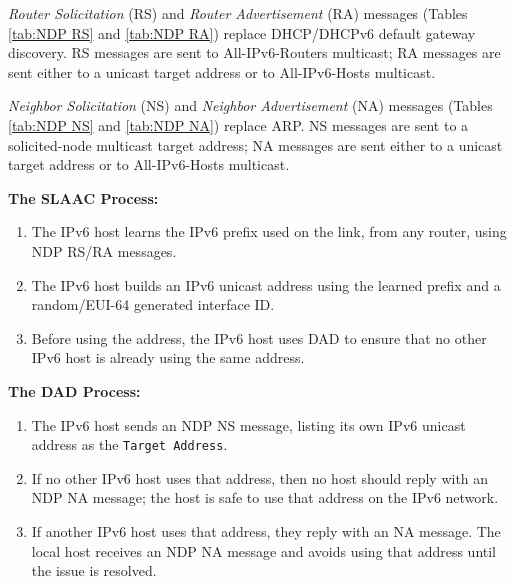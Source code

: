 \documentclass[12pt]{article}
\begin{document}
	\textit{Router Solicitation} (RS) and \textit{Router Advertisement} (RA) messages (Tables \ref{tab:NDP RS} and \ref{tab:NDP RA}) replace DHCP/DHCPv6 default gateway discovery. RS messages are sent to All-IPv6-Routers multicast; RA messages are sent either to a unicast target address or to All-IPv6-Hosts multicast.

	\textit{Neighbor Solicitation} (NS) and \textit{Neighbor Advertisement} (NA) messages (Tables \ref{tab:NDP NS} and \ref{tab:NDP NA}) replace ARP. NS messages are sent to a solicited-node multicast target address; NA messages are sent either to a unicast target address or to All-IPv6-Hosts multicast.

	\textbf{The SLAAC Process:}
	\begin{enumerate} \itemsep -5pt
		\label{itm:NDP SLAAC}
		\item{The IPv6 host learns the IPv6 prefix used on the link, from any router, using NDP RS/RA messages.}
		\item{The IPv6 host builds an IPv6 unicast address using the learned prefix and a random/EUI-64 generated interface ID.}
		\item{Before using the address, the IPv6 host uses DAD to ensure that no other IPv6 host is already using the same address.}
	\end{enumerate}

	\textbf{The DAD Process:}
	\begin{enumerate} \itemsep -5pt
		\label{itm:NDP DAD}
		\item{The IPv6 host sends an NDP NS message, listing its own IPv6 unicast address as the \texttt{Target Address}.}
		\item{If no other IPv6 host uses that address, then no host should reply with an NDP NA message; the host is safe to use that address on the IPv6 network.}
		\item{If another IPv6 host uses that address, they reply with an NA message. The local host receives an NDP NA message and avoids using that address until the issue is resolved.}
	\end{enumerate}
\end{document}
